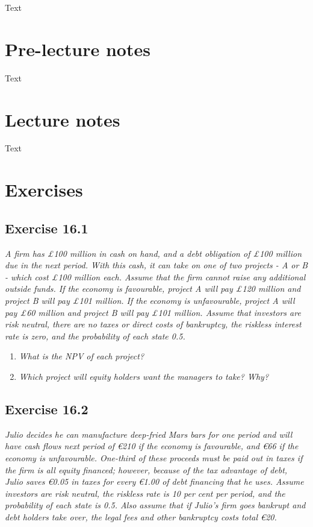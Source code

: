 \documentclass[]{book}
\newcommand{\euro}{€}
\theoremstyle{definition}
\theoremstyle{definition}
\theoremstyle{remark}
\begin{document}
Text

\section{Pre-lecture notes}\label{pre-lecture-notes-16}

Text

\section{Lecture notes}\label{lecture-notes-16}

Text

\section{Exercises}\label{exercises-16}

\subsection{Exercise 16.1}\label{exercise-16.1}

\emph{A firm has £100 million in cash on hand, and a debt obligation of
£100 million due in the next period. With this cash, it can take on one
of two projects - A or B - which cost £100 million each. Assume that the
firm cannot raise any additional outside funds. If the economy is
favourable, project A will pay £120 million and project B will pay £101
million. If the economy is unfavourable, project A will pay £60 million
and project B will pay £101 million. Assume that investors are risk
neutral, there are no taxes or direct costs of bankruptcy, the riskless
interest rate is zero, and the probability of each state 0.5.}
\citep[p.550]{book}

\begin{enumerate}
\def\labelenumi{\alph{enumi}.}
\item
  \emph{What is the NPV of each project?} \citep[p.550]{book}
\item
  \emph{Which project will equity holders want the managers to take?
  Why?} \citep[p.550]{book}
\end{enumerate}

\subsection{Exercise 16.2}\label{exercise-16.2}

\emph{Julio decides he can manufacture deep-fried Mars bars for one
period and will have cash flows next period of \euro{}210 if the economy
is favourable, and \euro{}66 if the economy is unfavourable. One-third
of these proceeds must be paid out in taxes if the firm is all equity
financed; however, because of the tax advantage of debt, Julio saves
\euro{}0.05 in taxes for every \euro{}1.00 of debt financing that he
uses. Assume investors are risk neutral, the riskless rate is 10 per
cent per period, and the probability of each state is 0.5. Also assume
that if Julio's firm goes bankrupt and debt holders take over, the legal
fees and other bankruptcy costs total \euro{}20.}
\citep[p.550-551]{book}
\end{document}

